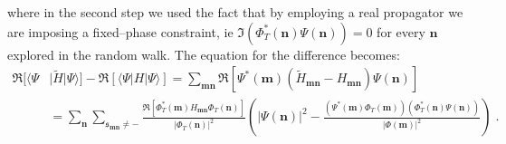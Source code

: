 where in the second step we used the fact that by employing a real propagator we are imposing a fixed--phase constraint,  ie $\Im (\Phi_T^*(\mathbf{n})\Psi(\mathbf{n})) = 0$ for every $\mathbf{n}$ explored in the random walk. The equation for the difference becomes:
\begin{equation}
\begin{split}
 \Re [\langle \Psi& \lvert \widetilde{H}\rvert\Psi \rangle] -\Re\left[ \langle \Psi |H|\Psi \rangle\right]=  \sum_{\mathbf{m}\mathbf{n}} \Re \left[\Psi^*(\mathbf{m}) (\widetilde{H}_{\mathbf{m}\mathbf{n}}-H_{\mathbf{m}\mathbf{n}})\Psi(\mathbf{n})\right]\\ 
&= \sum_{\mathbf{n}} \sum_{\mathfrak{s}_{\mathbf{m}\mathbf{n}} \neq -} \frac{\Re \left [ \Phi_T^*(\mathbf{m}) H_{\mathbf{m}\mathbf{n}} \Phi_T(\mathbf{n})\right ]}{ \lvert \Phi_T (\mathbf{n}) \rvert ^2}\left( \lvert\Psi(\mathbf{n})\rvert^2  - \frac{(\Psi^*(\mathbf{m}) \Phi_T(\mathbf{m}))  (\Phi_T^*(\mathbf{n})\Psi(\mathbf{n}))}{\lvert\Phi(\mathbf{m})\rvert^2 }\right) \;.\\
\end{split}
\end{equation}

